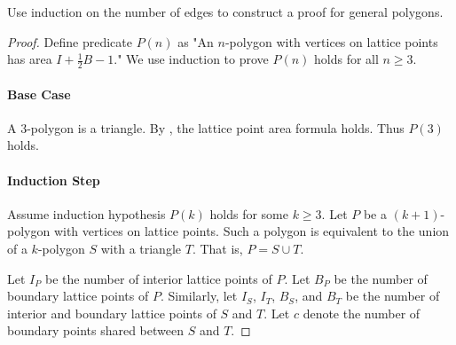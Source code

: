 \documentclass{report}
\begin{document}
Use induction on the number of edges to construct a proof for general polygons.

\begin{proof}

  Define predicate $P(n)$ as "An $n$-polygon with vertices on lattice points has
    area $I + \frac{1}{2}B - 1$."
  We use induction to prove $P(n)$ holds for all $n \geq 3$.

  \paragraph{Base Case}%

    A $3$-polygon is a triangle.
    By , the lattice point area formula holds.
    Thus $P(3)$ holds.

  \paragraph{Induction Step}%

    Assume induction hypothesis $P(k)$ holds for some $k \geq 3$.
    Let $P$ be a $(k + 1)$-polygon with vertices on lattice points.
    Such a polygon is equivalent to the union of a $k$-polygon $S$ with a
      triangle $T$.
    That is, $P = S \cup T$.

    Let $I_P$ be the number of interior lattice points of $P$.
    Let $B_P$ be the number of boundary lattice points of $P$.
    Similarly, let $I_S$, $I_T$, $B_S$, and $B_T$ be the number of interior
      and boundary lattice points of $S$ and $T$.
    Let $c$ denote the number of boundary points shared between $S$ and $T$.


\end{proof}
\end{document}
